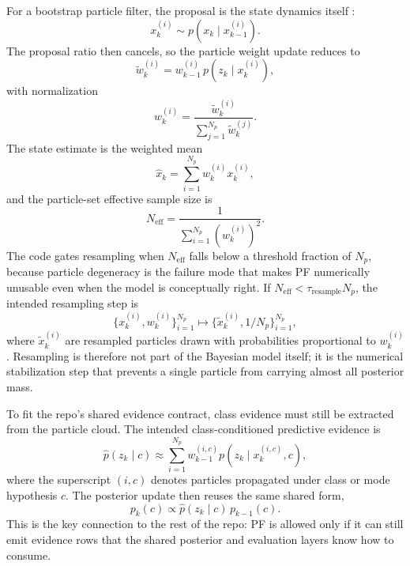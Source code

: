 \documentclass[11pt]{article}
\begin{document}
For a bootstrap particle filter, the proposal is the state dynamics itself
\cite{gordon1993,doucet2001}:
\begin{equation}
    x_k^{(i)} \sim p(x_k \mid x_{k-1}^{(i)}).
\end{equation}
The proposal ratio then cancels, so the particle weight update reduces to
\begin{equation}
    \tilde{w}_k^{(i)}
    =
    w_{k-1}^{(i)}\,p(z_k \mid x_k^{(i)}),
\end{equation}
with normalization
\begin{equation}
    w_k^{(i)}
    =
    \frac{\tilde{w}_k^{(i)}}{\sum_{j=1}^{N_p}\tilde{w}_k^{(j)}}.
\end{equation}
The state estimate is the weighted mean
\begin{equation}
    \hat{x}_k
    =
    \sum_{i=1}^{N_p} w_k^{(i)} x_k^{(i)},
\end{equation}
and the particle-set effective sample size is
\begin{equation}
    N_{\text{eff}}
    =
    \frac{1}{\sum_{i=1}^{N_p} (w_k^{(i)})^2}.
\end{equation}
The code gates resampling when \(N_{\text{eff}}\) falls below a threshold
fraction of \(N_p\), because particle degeneracy is the failure mode that makes
PF numerically unusable even when the model is conceptually right.
If \(N_{\text{eff}} < \tau_{\text{resample}} N_p\), the intended resampling
step is
\begin{equation}
    \{x_k^{(i)}, w_k^{(i)}\}_{i=1}^{N_p}
    \mapsto
    \{\tilde{x}_k^{(i)}, 1/N_p\}_{i=1}^{N_p},
\end{equation}
where \(\tilde{x}_k^{(i)}\) are resampled particles drawn with probabilities
proportional to \(w_k^{(i)}\). Resampling is therefore not part of the
Bayesian model itself; it is the numerical stabilization step that prevents a
single particle from carrying almost all posterior mass.

To fit the repo's shared evidence contract, class evidence must still be
extracted from the particle cloud. The intended class-conditioned predictive
evidence is
\begin{equation}
    \hat{p}(z_k \mid c)
    \approx
    \sum_{i=1}^{N_p}
    w_{k-1}^{(i,c)} p(z_k \mid x_k^{(i,c)}, c),
\end{equation}
where the superscript \((i,c)\) denotes particles propagated under class or
mode hypothesis \(c\). The posterior update then reuses the same shared form,
\begin{equation}
    p_k(c)
    \propto
    \hat{p}(z_k \mid c)\,p_{k-1}(c).
\end{equation}
This is the key connection to the rest of the repo: PF is allowed only if it
can still emit evidence rows that the shared posterior and evaluation layers
know how to consume.
\end{document}
